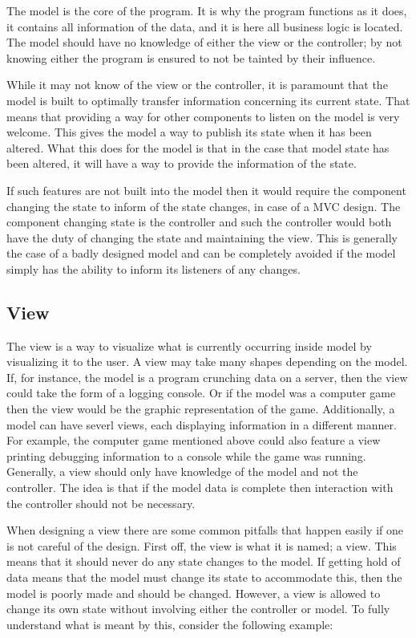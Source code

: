 The model is the core of the program. It is why the program functions
as it does, it contains all information of the data, and it is here
all business logic is located. The model should have no knowledge
of either the view or the controller; by not knowing either the program
is ensured to not be tainted by their influence.

While it may not know of the view or the controller, it is paramount
that the model is built to optimally transfer information concerning
its current state. That means that providing a way for other components
to listen on the model is very welcome\emph{. }This gives the model
a way to publish its state when it has been altered\emph{.} What this
does for the model is that in the case that model state has been altered,
it will have a way to provide the information of the state. 

If such features are not built into the model then it would require
the component changing the state to inform of the state changes, in
case of a MVC design. The component changing state is the controller
and such the controller would both have the duty of changing the state
and maintaining the view. This is generally the case of a badly designed
model and can be completely avoided if the model simply has the ability
to inform its listeners of any changes.


\subsection{View}

The view is a way to visualize what is currently occurring inside
model by visualizing it to the user. A view may take many shapes depending
on the model. If, for instance, the model is a program crunching data
on a server, then the view could take the form of a logging console.
Or if the model was a computer game then the view would be the graphic
representation of the game. Additionally, a model can have severl
views, each displaying information in a different manner. For example,
the computer game mentioned above could also feature a view printing
debugging information to a console while the game was running. Generally,
a view should only have knowledge of the model and not the controller.
The idea is that if the model data is complete then interaction with
the controller should not be necessary.

When designing a view there are some common pitfalls that happen easily
if one is not careful of the design. First off, the view is what it
is named; a view. This means that it should never do any state changes
to the model. If getting hold of data means that the model must change
its state to accommodate this, then the model is poorly made and should
be changed. However, a view is allowed to change its own state without
involving either the controller or model. To fully understand what
is meant by this, consider the following example:

